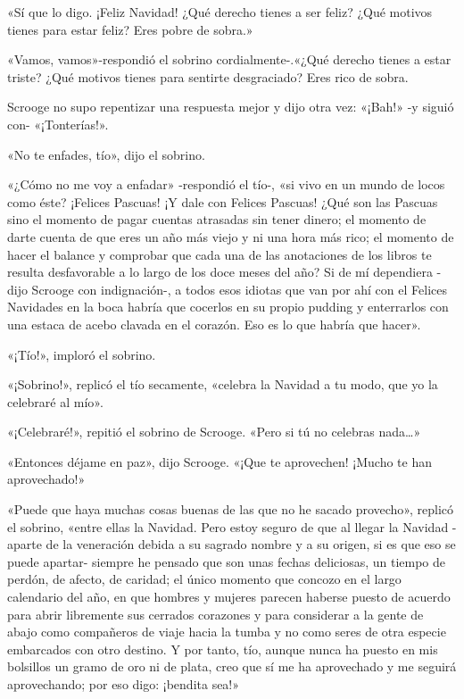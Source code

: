 \documentclass{novela}
\begin{document}
 «Sí que lo digo. ¡Feliz Navidad! ¿Qué derecho tienes a ser feliz? ¿Qué motivos tienes para estar feliz? Eres pobre de sobra.»

 «Vamos, vamos»-respondió el sobrino cordialmente-.«¿Qué derecho tienes a estar triste? ¿Qué motivos tienes para sentirte desgraciado? Eres rico de sobra.

 Scrooge no supo repentizar una respuesta mejor y dijo otra vez: «¡Bah!» -y siguió con- «¡Tonterías!».

 «No te enfades, tío», dijo el sobrino.

 «¿Cómo no me voy a enfadar» -respondió el tío-, «si vivo en un mundo de locos como éste? ¡Felices Pascuas! ¡Y dale con Felices Pascuas! ¿Qué son las Pascuas sino el momento de pagar cuentas atrasadas sin tener dinero; el momento de darte cuenta de que eres un año más viejo y ni una hora más rico; el momento de hacer el balance y comprobar que cada una de las anotaciones de los libros te resulta desfavorable a lo largo de los doce meses del año? Si de mí dependiera -dijo Scrooge con indignación-, a todos esos idiotas que van por ahí con el Felices Navidades en la boca habría que cocerlos en su propio pudding y enterrarlos con una estaca de acebo clavada en el corazón. Eso es lo que habría que hacer».

 «¡Tío!», imploró el sobrino.

 «¡Sobrino!», replicó el tío secamente, «celebra la Navidad a tu modo, que yo la celebraré al mío».

 «¡Celebraré!», repitió el sobrino de Scrooge. «Pero si tú no celebras nada{\ldots}»

 «Entonces déjame en paz», dijo Scrooge. «¡Que te aprovechen! ¡Mucho te han aprovechado!»

 «Puede que haya muchas cosas buenas de las que no he sacado provecho», replicó el sobrino, «entre ellas la Navidad. Pero estoy seguro de que al llegar la Navidad -aparte de la veneración debida a su sagrado nombre y a su origen, si es que eso se puede apartar- siempre he pensado que son unas fechas deliciosas, un tiempo de perdón, de afecto, de caridad; el único momento que concozo en el largo calendario del año, en que hombres y mujeres parecen haberse puesto de acuerdo para abrir libremente sus cerrados corazones y para considerar a la gente de abajo como compañeros de viaje hacia la tumba y no como seres de otra especie embarcados con otro destino. Y por tanto, tío, aunque nunca ha puesto en mis bolsillos un gramo de oro ni de plata, creo que sí me ha aprovechado y me seguirá aprovechando; por eso digo: ¡bendita sea!»
\end{document}
